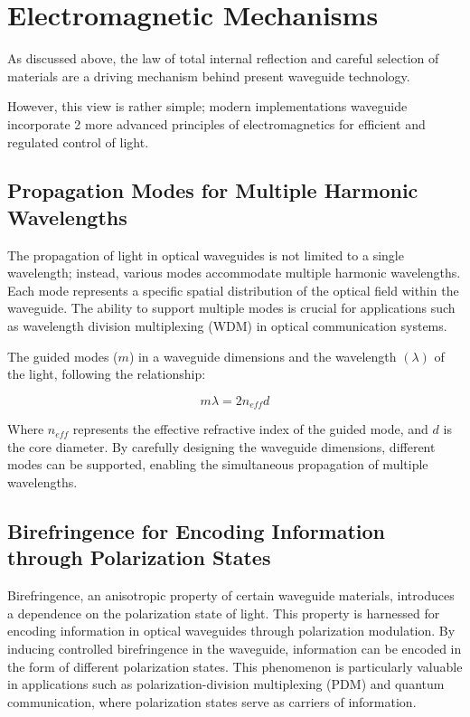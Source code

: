 \documentclass[10pt]{article}
\begin{document}
\section{Electromagnetic Mechanisms}

As discussed above, the law of total internal reflection and careful selection of materials are a driving mechanism behind present waveguide technology.

However, this view is rather simple; modern implementations waveguide incorporate 2 more advanced principles of electromagnetics for 
efficient and regulated control of light. 

\subsection{Propagation Modes for Multiple Harmonic Wavelengths}
The propagation of light in optical waveguides is not limited to a single wavelength; instead, various modes accommodate multiple harmonic wavelengths. Each mode represents a specific spatial distribution of the optical field within the waveguide. The ability to support multiple modes is crucial for applications such as wavelength division multiplexing (WDM) in optical communication systems.

The guided modes ($m$) in a waveguide dimensions and the wavelength $(\lambda)$ of the light, following the relationship:

\begin{equation}
    m\lambda = 2n_{eff}d
\end{equation}

Where $n_{eff}$ represents the effective refractive index of the guided mode, and
$d$ is the core diameter. By carefully designing the waveguide dimensions, different modes can be supported, enabling the simultaneous propagation of multiple wavelengths.

\subsection{Birefringence for Encoding Information through Polarization States}

Birefringence, an anisotropic property of certain waveguide materials, introduces a dependence on the polarization state of light. This property is harnessed for encoding information in optical waveguides through polarization modulation.
By inducing controlled birefringence in the waveguide, information can be encoded in the form of different polarization states. This phenomenon is particularly valuable in applications such as polarization-division multiplexing (PDM) and quantum communication, where polarization states serve as carriers of information.
\end{document}
